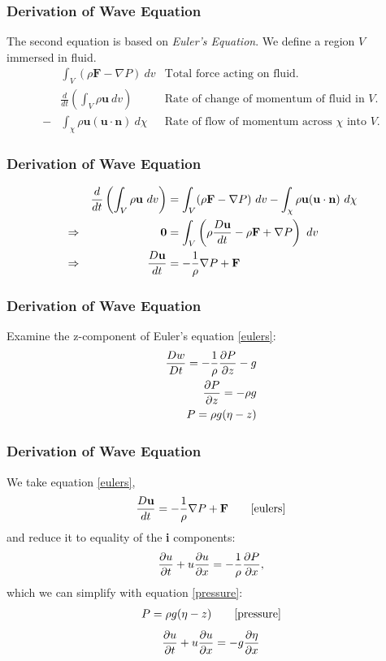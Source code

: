 	\begin{frame}
		\frametitle{Derivation of Wave Equation}
		The second equation is based on \textit{Euler's Equation}.  We define a region $V$ immersed in fluid.
		\begin{align*}
			&\int_{V} (\rho \textbf{F} - \nabla P) \ dv & \text{Total force acting on fluid.}\\
			&\frac{d}{dt} \left( \int_{V} \rho \textbf{u} \ dv \right) & \text{Rate of change of momentum of fluid in $V$.}\\
			-& \int_{\chi} \rho \textbf{u}(\textbf{u}\cdot \textbf{n}) \ d\chi & \text{Rate of flow of momentum across $\chi$ into $V$.}
		\end{align*}
	\end{frame}

	\begin{frame}
		\frametitle{Derivation of Wave Equation}
		\begin{align}
			&&\frac{d}{dt} \left( \int_{V} \rho\textbf{u} \ dv \right) &= \int_{V} ( \rho \textbf{F} - \nabla P) \ dv - \int_{\chi} \rho \textbf{u}(\textbf{u}\cdot \textbf{n}) \ d\chi \notag\\
			&\Rightarrow
			& \textbf{0} &= \int_{V} \left( \rho \frac{D\textbf{u}}{dt} - \rho \textbf{F} + \nabla P \right) \ dv \notag\\
			&\Rightarrow
			&\frac{D\textbf{u}}{dt} &= - \frac{1}{\rho} \nabla P + \label{eulers} \textbf{F} 
		\end{align}
	\end{frame}

	\begin{frame}
		\frametitle{Derivation of Wave Equation}
		Examine the z-component of Euler's equation \eqref{eulers}:
		\begin{align}
			\frac{Dw}{Dt} = -\frac{1}{\rho}\frac{\partial P}{\partial z} -g \notag\\
			\frac{\partial P}{\partial z} = -\rho g \notag\\
			P = \rho g (\eta - z) \label{pressure}
		\end{align}
	\end{frame}

	\begin{frame}
		\frametitle{Derivation of Wave Equation}
		We take equation \eqref{eulers},
		\begin{align*}
			\frac{D\textbf{u}}{dt} = - \frac{1}{\rho} \nabla P + \textbf{F} \tag*{\eqref{eulers}}
		\end{align*}
		and reduce it to equality of the \textbf{i} components:
		\begin{align*}
			\frac{ \partial u}{\partial t} + u\frac{ \partial u}{\partial x} = -\frac{1}{\rho}\frac{ \partial P}{\partial x},
		\end{align*}
		which we can simplify with equation \eqref{pressure}:
		\begin{align*}
			P = \rho g (\eta - z) \tag*{\eqref{pressure}}
		\end{align*}
		\begin{align}
			\label{eulersi}\frac{ \partial u}{\partial t} + u\frac{ \partial u}{\partial x} = -g \frac{ \partial \eta}{\partial x}
		\end{align}
	\end{frame}

